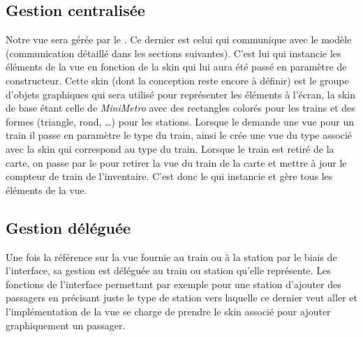 \documentclass[report, backcover, french, nodocumentinfo]{upmethodology-document}
\begin{document}
			\subsection{Gestion centralisée}
				Notre vue sera gérée par le . Ce dernier est celui qui communique avec le modèle (communication détaillé dans les sections suivantes). C'est lui qui instancie les éléments de la vue en fonction de la skin qui lui aura été passé en paramètre de constructeur. Cette skin (dont la conception reste encore à définir) est le groupe d'objets graphiques qui sera utilisé pour représenter les éléments à l'écran, la skin de base étant celle de \textit{MiniMetro} avec des rectangles colorés pour les trains et des formes (triangle, rond, \ldots) pour les stations. Lorsque le  demande une vue pour un train il passe en paramètre le type du train, ainsi le  crée une vue du type associé avec la skin qui correspond au type du train. Lorsque le train est retiré de la carte, on passe par le  pour retirer la vue du train de la carte et mettre à jour le compteur de train de l'inventaire. C'est donc le  qui instancie et gère tous les éléments de la vue.
			\subsection{Gestion déléguée}
				Une fois la référence sur la vue fournie au train ou à la station par le biais de l'interface, sa gestion est déléguée au train ou station qu'elle représente. Les fonctions de l'interface permettant par exemple pour une station d'ajouter des passagers en précisant juste le type de station vers laquelle ce dernier veut aller et l'implémentation de la vue se charge de prendre le skin associé pour ajouter graphiquement un passager.
\end{document}
